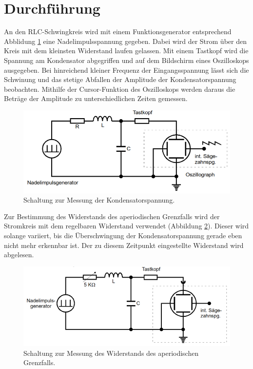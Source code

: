 \section{Durchführung}
\label{sec:Durchführung}

An den RLC-Schwingkreis wird mit einem Funktionsgenerator entsprechend Abblidung \ref{fig:Schaltung1}
eine Nadelimpulsspannung gegeben. Dabei wird der Strom über den Kreis mit dem kleinsten
Widerstand laufen gelassen. Mit einem Tastkopf wird die Spannung am Kondensator
abgegriffen und auf dem Bildschirm eines Oszilloskops ausgegeben. Bei hinreichend kleiner Frequenz der
Eingangsspannung lässt sich die Schwinung und das stetige Abfallen der Amplitude
der Kondensatorspannung beobachten. Mithilfe der Cursor-Funktion des Oszilloskops
werden daraus die Beträge der Amplitude zu unterschiedlichen Zeiten gemessen.

\begin{figure}[H]
  \centering
  \includegraphics[width=14cm]{Schaltung1.PNG}
  \caption{Schaltung zur Messung der Kondensatorspannung. \cite{sample}}
  \label{fig:Schaltung1}
\end{figure}

Zur Bestimmung des Widerstands des aperiodischen Grenzfalls wird der Stromkreis
mit dem regelbaren Widerstand verwendet (Abbildung \ref{fig:Schaltung2}). Dieser wird solange variiert, bis die
Überschwingung der Kondensatorspannung gerade eben nicht mehr erkennbar ist.
Der zu diesem Zeitpunkt eingestellte Widerstand wird abgelesen.

\begin{figure}[H]
  \centering
  \includegraphics[width=14cm]{Schaltung2.PNG}
  \caption{Schaltung zur Messung des Widerstands des aperiodischen Grenzfalls. \cite{sample}}
  \label{fig:Schaltung2}
\end{figure}

